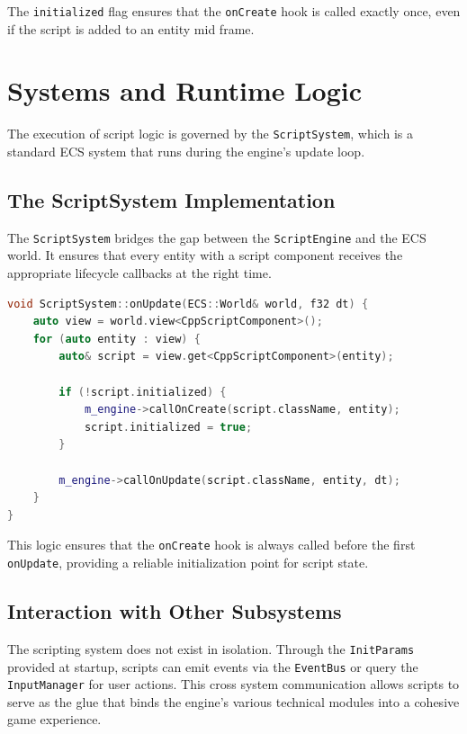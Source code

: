 The \texttt{initialized} flag ensures that the \texttt{onCreate} hook is called exactly once, even if the script is added to an entity mid frame.

\section{Systems and Runtime Logic}

The execution of script logic is governed by the \texttt{ScriptSystem}, which is a standard ECS system that runs during the engine's update loop.

\subsection{The ScriptSystem Implementation}

The \texttt{ScriptSystem} bridges the gap between the \texttt{ScriptEngine} and the ECS world. It ensures that every entity with a script component receives the appropriate lifecycle callbacks at the right time.

\begin{lstlisting}[language=C++, caption=ScriptSystem Update Logic]
void ScriptSystem::onUpdate(ECS::World& world, f32 dt) {
    auto view = world.view<CppScriptComponent>();
    for (auto entity : view) {
        auto& script = view.get<CppScriptComponent>(entity);
        
        if (!script.initialized) {
            m_engine->callOnCreate(script.className, entity);
            script.initialized = true;
        }

        m_engine->callOnUpdate(script.className, entity, dt);
    }
}
\end{lstlisting}

This logic ensures that the \texttt{onCreate} hook is always called before the first \texttt{onUpdate}, providing a reliable initialization point for script state.

\subsection{Interaction with Other Subsystems}

The scripting system does not exist in isolation. Through the \texttt{InitParams} provided at startup, scripts can emit events via the \texttt{EventBus} or query the \texttt{InputManager} for user actions. This cross system communication allows scripts to serve as the glue that binds the engine's various technical modules into a cohesive game experience.

